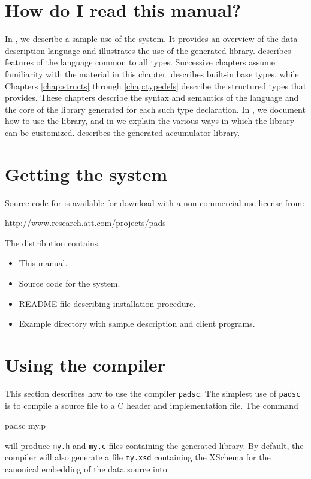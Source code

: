 \section{How do I read this manual?}
In , we describe a sample use of the \PADS{}
system. It provides an overview of the data description language and
illustrates the use of the generated library.
 describes features of the \PADS{}
language common to all \padsl{} types.  Successive chapters assume
familiarity with the material in this chapter.
 describes built-in \padsl{} base types, while
Chapters \ref{chap:structs} through \ref{chap:typedefs} describe the
structured types that \padsl{} provides. These chapters describe the
syntax and semantics of the \pads{} language and the core of the
library generated for each such type declaration.
In , we document how to use the \pads{}
library, and in  we explain the various
ways in which the \pads{} library can be customized. 
 describes the generated accumulator
library.


\section{Getting the \PADS{} system}
Source code for \PADS{} is available for download with
a non-commercial use license from: 
\begin{centercode}
http://www.research.att.com/projects/pads
\end{centercode}
\noindent
The \PADS{} distribution contains:
\begin{itemize}
\item This manual.
\item Source code for the \pads{} system.
\item README file describing installation procedure.
\item Example directory with sample \PADS{} description and client programs.
\end{itemize}

\section{Using the \PADS{} compiler}
This section describes how to use the \PADS{} compiler \texttt{padsc}.
The simplest use of \texttt{padsc} is to compile a \PADSL{} source file
to a C header and implementation file.  The command
\begin{centercode}
padsc my.p
\end{centercode} %
will produce \texttt{my.h} and \texttt{my.c} files containing the
generated library.  By default, the compiler will also generate a file
\texttt{my.xsd} containing the XSchema for the \PADS{} canonical
embedding of the data source into \xml{}.

